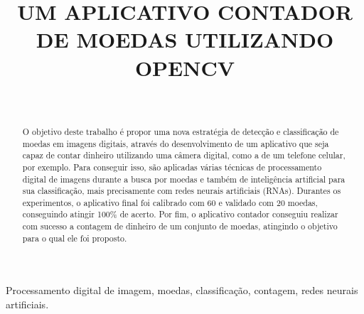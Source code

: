 \documentclass[10pt,journal]{IEEEtran}
\begin{document}
\title{UM APLICATIVO CONTADOR DE MOEDAS UTILIZANDO OPENCV}

\author{
	\and \\
}

\maketitle

\begin{abstract}
O objetivo deste trabalho é propor uma nova estratégia de detecção e classificação de moedas em imagens digitais, através do desenvolvimento de um aplicativo que seja capaz de contar dinheiro utilizando uma câmera digital, como a de um telefone celular, por exemplo. Para conseguir isso, são aplicadas várias técnicas de processamento digital de imagens durante a busca por moedas e também de inteligência artificial para sua classificação, mais precisamente com redes neurais artificiais (RNAs). Durantes os experimentos, o aplicativo final foi calibrado com 60 e validado com 20 moedas, conseguindo atingir 100\% de acerto. Por fim, o aplicativo contador conseguiu realizar com sucesso a contagem de dinheiro de um conjunto de moedas, atingindo o objetivo para o qual ele foi proposto. 
\end{abstract}

\begin{IEEEkeywords}
Processamento digital de imagem, moedas, classificação, contagem, redes neurais artificiais.
\end{IEEEkeywords}


%
\end{document}
